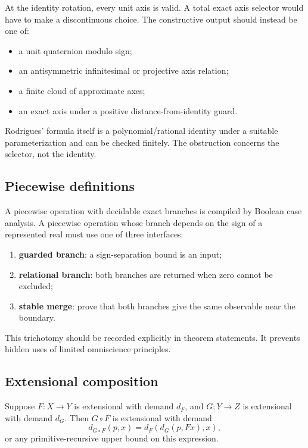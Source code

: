 At the identity rotation, every unit axis is valid.  A total exact axis selector would have to make a discontinuous choice.  The constructive output should instead be one of:

\begin{itemize}
\item a unit quaternion modulo sign;
\item an antisymmetric infinitesimal or projective axis relation;
\item a finite cloud of approximate axes;
\item an exact axis under a positive distance-from-identity guard.
\end{itemize}

Rodrigues' formula itself is a polynomial/rational identity under a suitable parameterization and can be checked finitely.  The obstruction concerns the selector, not the identity.

\subsection{Piecewise definitions}

A piecewise operation with decidable exact branches is compiled by Boolean case analysis.  A piecewise operation whose branch depends on the sign of a represented real must use one of three interfaces:

\begin{enumerate}
\item \textbf{guarded branch}: a sign-separation bound is an input;
\item \textbf{relational branch}: both branches are returned when zero cannot be excluded;
\item \textbf{stable merge}: prove that both branches give the same observable near the boundary.
\end{enumerate}

This trichotomy should be recorded explicitly in theorem statements.  It prevents hidden uses of limited omniscience principles.

\subsection{Extensional composition}

\begin{theorem}
\label{thm:precision-composition}
Suppose \(F:X\to Y\) is extensional with demand \(d_F\), and \(G:Y\to Z\) is extensional with demand \(d_G\).  Then \(G\circ F\) is extensional with demand
\[
 d_{G\circ F}(p,x)=d_F(d_G(p,Fx),x),
\]
or any primitive-recursive upper bound on this expression.
\end{theorem}

